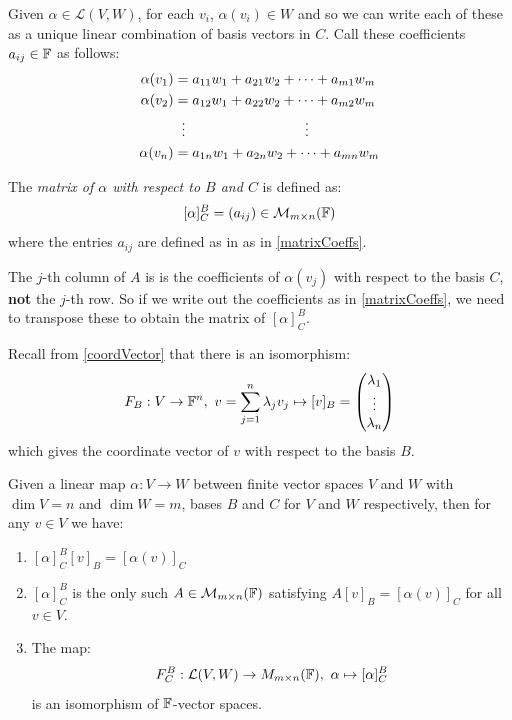 \documentclass[../main.tex]{subfiles}
\begin{document}
Given $\alpha \in \mathcal{L}(V, W)$, for each $v_i$, $\alpha(v_i) \in W$ and so we can write each of these as a unique linear combination of basis vectors in $C$.
Call these coefficients $a_{i j} \in \mathbb{F}$ as follows:
\begin{align}
  \label{matrixCoeffs}
  \begin{split}
  \alpha(v_1) &= a_{1 1}w_1 + a_{2 1}w_2 + \cdots + a_{m 1}w_m \\
  \alpha(v_2) &= a_{1 2}w_1 + a_{2 2}w_2 + \cdots + a_{m 2}w_m \\
              &\hspace{0.2cm} \vdots \hspace{3.0cm} \vdots \\
  \alpha(v_n) &= a_{1 n}w_1 + a_{2 n}w_2 + \cdots + a_{m n}w_m
  \end{split}
\end{align}
\begin{definition}
  The \textit{matrix of $\alpha$ with respect to $B$ and $C$} is defined as:
  \[
    [\alpha]^{B}_{C} = (a_{i j}) \in \mathcal{M}_{m \times n}(\mathbb{F})
  \]
  where the entries $a_{i j}$ are defined as in as in \cref{matrixCoeffs}.
\end{definition}
\begin{remark}[Warning]
  The $j$-th column of $A$ is is the coefficients of $\alpha(v_j)$ with respect to the basis $C$, \textbf{not} the $j$-th row.
  So if we write out the coefficients as in \cref{matrixCoeffs}, we need to transpose these to obtain the matrix of $[\alpha]^{B}_{C}$.
\end{remark}
Recall from \cref{coordVector} that there is an isomorphism:
\[
  F_B: V \to \mathbb{F}^n,\ v = \sum_{j = 1}^{n} \lambda_j v_j \mapsto [v]_{B} =  \begin{pmatrix}
  \lambda_1 \\
  \vdots \\
  \lambda_n \\
  \end{pmatrix}
\]
which gives the coordinate vector of $v$ with respect to the basis $B$.
\begin{theorem}
  Given a linear map $\alpha: V \to W$ between finite vector spaces $V$ and $W$ with $\dim V = n$ and $\dim W = m$, bases $B$ and $C$ for $V$ and $W$ respectively, then for any $v \in V$ we have: \label{basisMapProp}
  \begin{enumerate}
    \item $[\alpha]^{B}_{C} [v]_{B} = [\alpha(v)]_{C}$
    \item $[\alpha]^{B}_{C}$ is the only such $A \in \mathcal{M}_{m \times n}(\mathbb{F})$ satisfying $A[v]_B = [\alpha(v)]_C$ for all $v \in V$.
    \item The map:
      \[
        F^{B}_{C}: \mathcal{L}(V, W) \to M_{m \times n}(\mathbb{F}),\ \alpha \mapsto [\alpha]^{B}_{C}
      \]
      is an isomorphism of $\mathbb{F}$-vector spaces.
  \end{enumerate}
\end{theorem}
\end{document}
